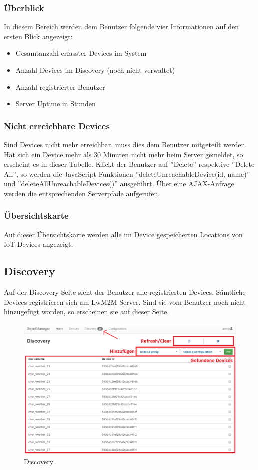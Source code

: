 \subsubsection{Überblick}
In diesem Bereich werden dem Benutzer folgende vier Informationen auf den ersten Blick angezeigt:
\begin{itemize}
\item Gesamtanzahl erfasster Devices im System
\item Anzahl Devices im Discovery (noch nicht verwaltet)
\item Anzahl registrierter Benutzer
\item Server Uptime in Stunden
\end{itemize}
 \newpage

\subsubsection{Nicht erreichbare Devices}
Sind Devices nicht mehr erreichbar, muss dies dem Benutzer mitgeteilt werden. Hat sich ein Device mehr als 30 Minuten nicht mehr beim Server gemeldet, so erscheint es in dieser Tabelle. Klickt der Benutzer auf ''Delete'' respektive ''Delete All'', so werden die JavaScript Funktionen ''deleteUnreachableDevice(id, name)'' und ''deleteAllUnreachableDevices()'' ausgeführt. Über eine AJAX-Anfrage werden die entsprechenden Serverpfade aufgerufen.

\subsubsection{Übersichtskarte}
Auf dieser Übersichtskarte werden alle im Device gespeicherten Locations von IoT-Devices angezeigt.

\newpage
\subsection{Discovery}
Auf der Discovery Seite sieht der Benutzer alle registrierten Devices. Sämtliche Devices registrieren sich am LwM2M Server. Sind sie vom Benutzer noch nicht hinzugefügt worden, so erscheinen sie auf dieser Seite.

\begin{figure}[H]
\centering
\includegraphics[scale=0.57]{../04_Realisierung/images/userinterface/discovery.png}
\caption{Discovery}
\end{figure}

